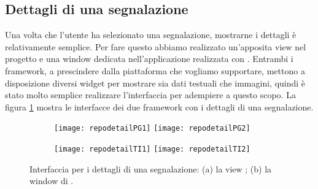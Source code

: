 		\subsection{Dettagli di una segnalazione}
		\label{subsec:dettagli}
			Una volta che l'utente ha selezionato una segnalazione, mostrarne i 
			dettagli è relativamente semplice. Per fare questo abbiamo 
			realizzato un'apposita view \kendomob{} nel progetto \pg{} e una 
			window dedicata nell'applicazione realizzata con \tisdk{}. Entrambi
            i framework, a prescindere dalla piattaforma che vogliamo
            supportare, mettono a disposizione diversi widget per mostrare sia
            dati testuali che immagini, quindi è stato molto semplice realizzare
            l'interfaccia per adempiere a questo scopo. La figura
            \ref{fig:repodetails} mostra le interfacce dei due framework con i
            dettagli di una segnalazione.
			\begin{figure}[h]
				\centering
				\begin{subfigure}[b]{0.9\textwidth}
					\texttt{[image: repodetailPG1]}
					\texttt{[image: repodetailPG2]}
					\caption{}
				\end{subfigure}
				\begin{subfigure}[b]{0.9\textwidth}
					\texttt{[image: repodetailTI1]}
					\texttt{[image: repodetailTI2]}
					\caption{}
				\end{subfigure}
				\caption{
					Interfaccia per i dettagli di una segnalazione: (a) la view
					\kendomob{}; (b) la window di \tisdk{}.
				}
				\label{fig:repodetails}
			\end{figure}
			
